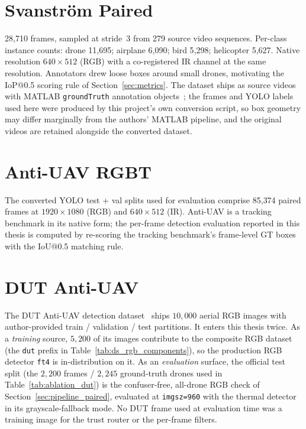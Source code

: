 \section{Svanstr\"om Paired}

28{,}710 frames, sampled at stride~3 from 279 source video sequences. Per-class instance counts: drone 11{,}695; airplane 6{,}090; bird 5{,}298; helicopter 5{,}627. Native resolution $640{\times}512$ (RGB) with a co-registered IR channel at the same resolution. Annotators drew loose boxes around small drones, motivating the IoP@0.5 scoring rule of Section~\ref{sec:metrics}. The dataset ships as source videos with MATLAB \texttt{groundTruth} annotation objects~\cite{svanstrom2022dronedataset}; the frames and YOLO labels used here were produced by this project's own conversion script, so box geometry may differ marginally from the authors' MATLAB pipeline, and the original videos are retained alongside the converted dataset.

\section{Anti-UAV RGBT}

The converted YOLO test + val splits used for evaluation comprise 85{,}374 paired frames at $1920{\times}1080$ (RGB) and $640{\times}512$ (IR). Anti-UAV is a tracking benchmark in its native form; the per-frame detection evaluation reported in this thesis is computed by re-scoring the tracking benchmark's frame-level GT boxes with the IoU@0.5 matching rule.

\section{DUT Anti-UAV}

The DUT Anti-UAV detection dataset~\cite{zhao2022dutantiuav} ships $10{,}000$ aerial RGB images with author-provided train / validation / test partitions. It enters this thesis twice. As a \emph{training} source, $5{,}200$ of its images contribute to the composite RGB dataset (the \texttt{dut} prefix in Table~\ref{tab:ds_rgb_components}), so the production RGB detector \texttt{ft4} is in-distribution on it. As an \emph{evaluation} surface, the official test split (the $2{,}200$ frames / $2{,}245$ ground-truth drones used in Table~\ref{tab:ablation_dut}) is the confuser-free, all-drone RGB check of Section~\ref{sec:pipeline_paired}, evaluated at \texttt{imgsz=960} with the thermal detector in its grayscale-fallback mode. No DUT frame used at evaluation time was a training image for the trust router or the per-frame filters.

